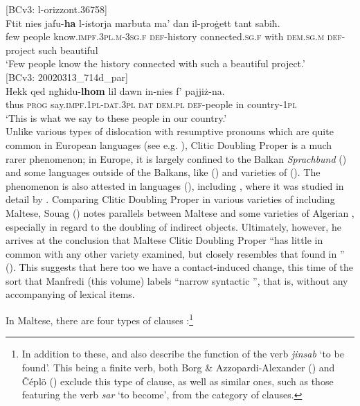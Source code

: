 \documentclass[output=paper]{langsci/langscibook}
\begin{document}
\ea\label{cdp01}
{[BCv3: l-orizzont.36758]}\\
\gll Ftit nies jafu-\textbf{ha} l-istorja marbuta ma' dan il-proġett tant sabiħ.\\
	few people know.\textsc{impf.3pl.m}-\textsc{3sg.f} \textsc{def}-history connected.\textsc{sg.f} with \textsc{dem.sg.m} \textsc{def}-project such beautiful\\
	\glt `Few people know the history connected with such a beautiful project.'\\
\ex\label{cdp02}
{[BCv3: 20020313\_714d\_par]}\\
\gll Hekk qed ngħidu-\textbf{lhom} lil dawn in-nies f' pajjiż-na.\\
	thus \textsc{prog} say.\textsc{impf.1pl}-\textsc{dat.3pl} \textsc{dat} \textsc{dem.pl} \textsc{def}-people in country-\textsc{1pl}\\
	\glt `This is what we say to these people in our country.'\\
\z
Unlike various types of dislocation with resumptive  pronouns which are quite common in European languages (see e.g. \citealt{Decat2010}), Clitic Doubling Proper is a much rarer phenomenon; in Europe, it is largely confined to the Balkan \textit{Sprachbund} (\citealt{Friedman2008}) and some  languages outside of the Balkans, like  (\citealt[7]{Zagona2002}) and varieties of  (\citealt[231--233]{Russi2008}). The phenomenon is also attested in  languages (\citealt{Khan1984}), including , where it was studied in detail by \cite{Souag2017clitic}. Comparing Clitic Doubling Proper in various varieties of  including Maltese, Souag (\citeyear[57]{Souag2017clitic}) notes parallels between Maltese and some varieties of Algerian , especially in regard to the doubling of indirect objects. Ultimately, however, he arrives at the conclusion that Maltese Clitic Doubling Proper ``has little in common with any other  variety examined, but closely resembles that found in '' (\citealt[60]{Souag2017clitic}). This suggests that here too we have a contact-induced change, this time of the sort that Manfredi (this volume) labels ``narrow syntactic '', that is, without any accompanying  of lexical items.

 \label{Copular} %
In Maltese, there are four types of  clauses \citep[53]{BorgAzzopardi-Alexander1997}:\footnote{In addition to these, \cite{Borg1987} and \cite{borgspagnol2015} also describe the  function of the verb \textit{jinsab} `to be found'. This being a finite verb, both Borg \& Azzopardi-Alexander (\citeyear[53]{BorgAzzopardi-Alexander1997}) and Čéplö (\citeyear[99--104]{bulbul2018}) exclude this type of clause, as well as similar ones, such as those featuring the verb \textit{sar} `to become', from the category of  clauses.}
\end{document}
